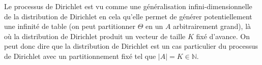 \documentclass[french]{article}
\numberwithin{equation}{section}
\begin{document}
Le processus de Dirichlet est vu comme une généralisation infini-dimensionnelle de la distribution de Dirichlet en cela qu'elle permet de générer potentiellement une infinité de table (on peut partitionner $\Theta$ en un $A$ arbitrairement grand), là où la distribution de Dirichlet produit un vecteur de taille $K$ fixé d'avance. On peut donc dire que la distribution de Dirichlet est un cas particulier du processus de Dirichlet avec un partitionnement fixé tel que $\left|A\right| = K \in \mathbb{N}$.
\end{document}
